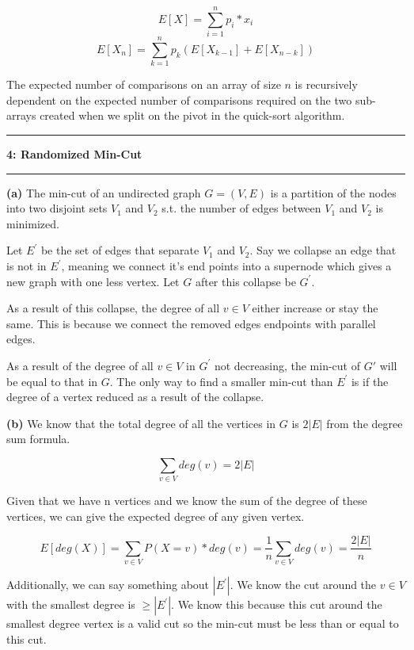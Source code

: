 \documentclass[11pt]{article}
\newcommand\question[2]{\vspace{.25in}\hrule\textbf{#1: #2}\vspace{.5em}\hrule\vspace{.10in}}
\renewcommand\part[1]{\vspace{.10in}\textbf{(#1)}}
\begin{document}
$$E[X] = \sum_{i = 1}^n p_i * x_i$$
$$E[X_n] = \sum_{k = 1}^n p_k(E[X_{k-1}] + E[X_{n-k}])$$

The expected number of comparisons on an array of size $n$ is recursively dependent on the expected number of comparisons required on the two sub-arrays created when we split on the pivot in the quick-sort algorithm.

\question{4}{Randomized Min-Cut}

\part{a} The min-cut of an undirected graph $G = (V, E)$ is a partition of the nodes into two disjoint sets $V_1$ and $V_2$ s.t. the number of edges between $V_1$ and $V_2$ is minimized.

Let $E^\prime$ be the set of edges that separate $V_1$ and $V_2$. Say we collapse an edge that is not in $E^\prime$, meaning we connect it's end points into a supernode which gives a new graph with one less vertex. Let $G$ after this collapse be $G^\prime$.

As a result of this collapse, the degree of all $v \in V$ either increase or stay the same. This is because we connect the removed edges endpoints with parallel edges.

As a result of the degree of all $v \in V$ in $G^\prime$ not decreasing, the min-cut of $G'$ will be equal to that in $G$. The only way to find a smaller min-cut than $E^\prime$ is if the degree of a vertex reduced as a result of the collapse.

\part{b} We know that the total degree of all the vertices in $G$ is $2|E|$ from the degree sum formula.

$$\sum_{v \in V} deg(v) = 2|E|$$

Given that we have n vertices and we know the sum of the degree of these vertices, we can give the expected degree of any given vertex.

$$E[deg(X)] = \sum_{v \in V} P(X = v) * deg(v) = \frac{1}{n}\sum_{v \in V}deg(v) = \frac{2|E|}{n}$$

Additionally, we can say something about $|E^\prime|$. We know the cut around the $v \in V$ with the smallest degree is $\geq |E^\prime|$. We know this because this cut around the smallest degree vertex is a valid cut so the min-cut must be less than or equal to this cut.
\end{document}

